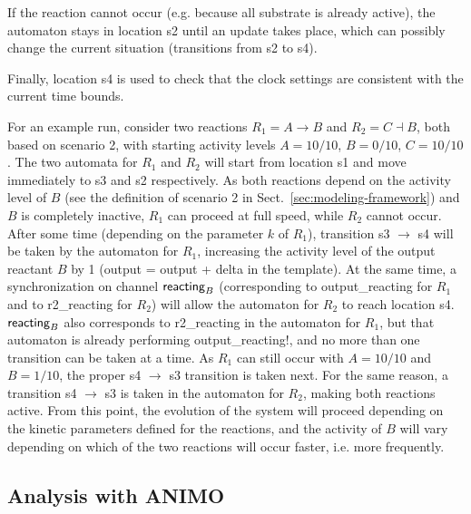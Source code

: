 \documentclass[journal, 10pt]{IEEEtran}
\begin{document}
If the reaction cannot occur (e.g. because all substrate is already active), the automaton stays in location {\sf s2}
until an update takes place, which can possibly change the current situation (transitions from {\sf s2} to {\sf s4}).

Finally, location {\sf s4} is used to check that the clock settings are consistent with the current time bounds.

For an example run, consider two reactions $R_1 = A \rightarrow B$ and $R_2 = C \dashv B$, both based on scenario 2, with starting
activity levels $A = 10/10$, $B = 0/10$, $C = 10/10$. The two automata for $R_1$ and $R_2$ will start
from location {\sf s1} and move immediately to {\sf s3} and {\sf s2} respectively. As 
both reactions depend on the activity level of $B$ (see the definition of scenario 2 in Sect.~\ref{sec:modeling-framework}) and
$B$ is completely inactive,
$R_1$ can proceed at full speed, while $R_2$ cannot occur. After some time (depending on the parameter $k$ of $R_1$),
transition {\sf s3} $\rightarrow$ {\sf s4} will be taken by the automaton for $R_1$, increasing the activity level
of the output reactant $B$ by 1 ({\sf output = output + delta} in the template).
At the same time, a synchronization on channel $\mbox{\sf reacting}_B$ (corresponding
to {\sf output\_{}reacting} for $R_1$ and to {\sf r2\_{}reacting} for $R_2$) will allow the automaton for $R_2$ to reach 
location {\sf s4}. $\mbox{\sf reacting}_B$
also corresponds to {\sf r2\_{}reacting} in the automaton for $R_1$,
but that automaton is already performing {\sf output\_{}reacting!}, and no more than one transition can be taken at a time.
As $R_1$ can still occur with $A = 10/10$ and $B = 1/10$, the proper {\sf s4} $\rightarrow$ {\sf s3} transition is taken next.
For the same reason, a transition {\sf s4} $\rightarrow$ {\sf s3} is taken in the automaton for $R_2$, making both reactions
active. From this point, the evolution of the system will proceed depending on the kinetic parameters defined for the reactions,
and the activity of $B$ will vary depending on which of the two reactions will occur faster, i.e. more frequently.




\subsection{Analysis with ANIMO}\label{sec:analysis-animo}
\end{document}
